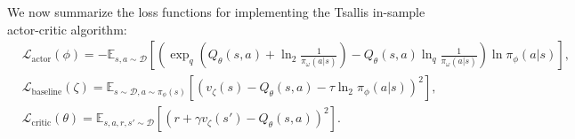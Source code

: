 \documentclass{article}
\newcommand{\AdaBracket}[1]{\left(#1\right)}
\newcommand{\AdaRectBracket}[1]{\left[#1\right]}
\newcommand{\expectation}[2]{\mathbb{E}_{#1}\AdaRectBracket{#2}}
\newcommand{\logq}[1]{\ln_{q}\!#1}
\newcommand{\datasetPolicy}{\pi_{\mathcal{D}}}
\begin{document}
We now summarize the loss functions for implementing the Tsallis in-sample actor-critic algorithm:
\begin{align}
    &\mathcal{L}_\text{actor}(\phi) = -\expectation{s,a \sim \mathcal{D}}{ \AdaBracket{ \exp_q\AdaBracket{Q_{\theta}(s,a) + \ln_2\frac{1}{\pi_{\omega}(a|s)}} -  Q_{\theta}(s,a)  \logq{\frac{1}{\pi_{\omega}(a|s)}} } \ln\pi_{\phi}(a|s) }, \\
    & \mathcal{L}_\text{baseline}(\zeta) = \expectation{s\sim\mathcal{D}, a\sim \pi_{\phi}(s)}{\AdaBracket{ v_{\zeta}(s) - Q_{\theta}(s,a) - \tau\ln_2\pi_{\phi}(a|s)}^2},\\
    & \mathcal{L}_\text{critic}(\theta) = \expectation{s,a,r,s' \sim \mathcal{D}}{\AdaBracket{r + \gamma v_{\zeta}(s') - Q_{\theta}(s,a)}^2 }.
\end{align}


\clearpage



\end{document}
